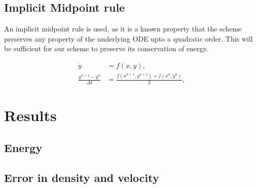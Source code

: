\documentclass[a4paper,11pt]{article}
\begin{document}
\subsection{Implicit Midpoint rule}
An implicit midpoint rule is used, as it is a known property that the scheme preserves any property of the underlying ODE upto a quadratic order. This will be sufficient for our scheme to preserve its conservation of energy.

\begin{equation} \begin{aligned} \dot {y} &= f(x,y),\\
\frac{y^{n+1}- y^n}{\Delta t} &= \frac{ f(x^{n+1}, y^{n+1}) + f(x^n, y^n)}{2}, \end{aligned}\end{equation}
%
%
%
%

\section{Results}

\subsection{Energy}


\subsection{ Error in density and velocity}
\end{document}
